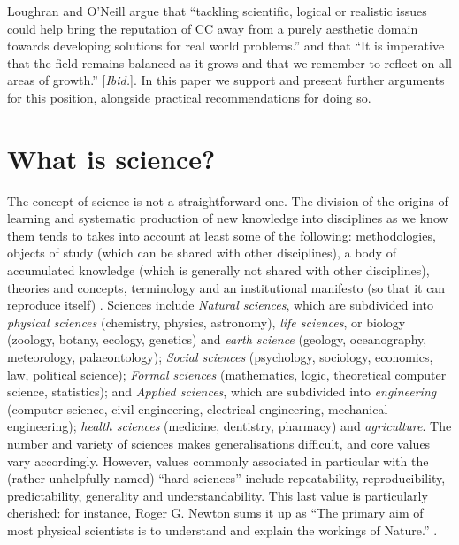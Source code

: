 \documentclass[letterpaper]{article}
\begin{document}
Loughran and O'Neill argue that ``tackling scientific, logical or
realistic issues could help bring the reputation of CC away from a
purely aesthetic domain towards developing solutions for real world
problems.'' \cite[p.7]{loughran17} and that ``It is imperative that
the field remains balanced as it grows and that we remember to reflect
on all areas of growth.'' [{\em Ibid.}]. In this paper we support and
present further arguments for this position, alongside practical
recommendations for doing so.




\section{What is science?}\label{science}
The concept of science is not a straightforward one. The division of
the origins of learning and systematic production of new knowledge
into disciplines as we know them tends to takes into account at least
some of the following: methodologies, objects of study (which can be
shared with other disciplines), a body of accumulated knowledge (which
is generally not shared with other disciplines), theories and
concepts, terminology and an institutional manifesto (so that it can
reproduce itself) \cite[p9]{krishnan2009academic}. Sciences include
{\em Natural sciences}, which are subdivided into {\em physical
  sciences} (chemistry, physics, astronomy), {\em life sciences}, or
biology (zoology, botany, ecology, genetics) and {\em earth science}
(geology, oceanography, meteorology, palaeontology); {\em Social
  sciences} (psychology, sociology, economics, law, political
science); {\em Formal sciences} (mathematics, logic, theoretical
computer science, statistics); and {\em Applied sciences}, which are
subdivided into {\em engineering} (computer science, civil
engineering, electrical engineering, mechanical engineering); {\em
  health sciences} (medicine, dentistry, pharmacy) and {\em
  agriculture}. The number and variety of sciences makes
generalisations difficult, and core values vary accordingly.  However,
values commonly associated in particular with the (rather unhelpfully
named) ``hard sciences'' include repeatability, reproducibility,
predictability, generality and understandability. This last value is
particularly cherished: for instance, Roger G. Newton sums it up as
``The primary aim of most physical scientists is to understand and
explain the workings of Nature.''  \cite[p. 4]{newton:2000}.
\end{document}
